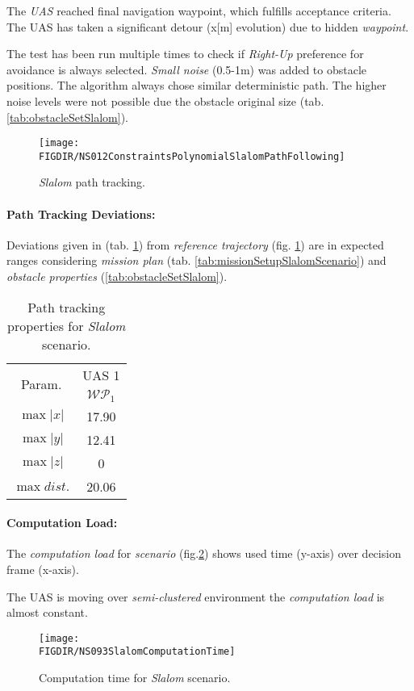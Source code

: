 The \emph{UAS} reached final navigation waypoint, which fulfills acceptance criteria. The UAS has taken a significant detour (x[m] evolution) due to hidden \emph{waypoint}. 

The test has been run multiple times to check if \emph{Right-Up} preference for avoidance is always selected. \emph{Small noise} (0.5-1m) was added to obstacle positions. The algorithm always chose similar deterministic path. The higher noise levels were not possible due the obstacle original size (tab. \ref{tab:obstacleSetSlalom}).

\begin{figure}[H]
    \centering
    \texttt{[image: \\FIGDIR/NS012ConstraintsPolynomialSlalomPathFollowing]} 
    \caption{\emph{Slalom} path tracking.}
    \label{fig:testCaseSlalomPathTracking}
\end{figure}


\paragraph{Path Tracking Deviations:} Deviations given in (tab. \ref{tab:pathTrackingParametersForSlalomAvoidance}) from \emph{reference trajectory} (fig. \ref{fig:testCaseSlalomPathTracking}) are in expected ranges considering \emph{mission plan} (tab. \ref{tab:missionSetupSlalomScenario}) and \emph{obstacle properties} (\ref{tab:obstacleSetSlalom}).

\begin{table}[H]
    \centering
    \begin{tabular}{c||c}
        \multirow{2}{*}{Param.} & UAS 1\\\cline{2-2}
                        & $\mathscr{WP}_1$  \\\hline\hline
          $\max |x|$    & 17.90      \\\hline
          $\max |y|$    & 12.41    \\\hline
          $\max |z|$    & 0        \\\hline
          $\max dist.$  & 20.06   \\
    \end{tabular}
    \caption{Path tracking properties for \emph{Slalom} scenario.}
    \label{tab:pathTrackingParametersForSlalomAvoidance}
\end{table}

\paragraph{Computation Load:} The \emph{computation load} for \emph{scenario} (fig.\ref{fig:slalomComputationTime}) shows used time (y-axis) over decision frame (x-axis).

The UAS is moving over \emph{semi-clustered} environment the \emph{computation load} is almost constant.

\begin{figure}[H]
    \centering
    \texttt{[image: \\FIGDIR/NS093SlalomComputationTime]} 
    \caption{Computation time for \emph{Slalom} scenario.}
    \label{fig:slalomComputationTime}
\end{figure}
